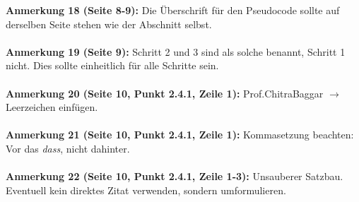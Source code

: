 \documentclass[a4paper,12pt]{book}
\begin{document}
\noindent
\textbf{Anmerkung 18 (Seite 8-9):}
Die Überschrift für den Pseudocode sollte auf derselben Seite stehen wie der Abschnitt selbst. \\
\\

\noindent
\textbf{Anmerkung 19 (Seite 9):}
Schritt 2 und 3 sind als solche benannt, Schritt 1 nicht. Dies sollte einheitlich für alle Schritte sein. \\
\\

\noindent
\textbf{Anmerkung 20 (Seite 10, Punkt 2.4.1, Zeile 1):}
Prof.ChitraBaggar $\rightarrow$ Leerzeichen einfügen. \\
\\

\noindent
\textbf{Anmerkung 21 (Seite 10, Punkt 2.4.1, Zeile 1):}
Kommasetzung beachten: Vor das \emph{dass}, nicht dahinter. \\
\\

\noindent
\textbf{Anmerkung 22 (Seite 10, Punkt 2.4.1, Zeile 1-3):}
Unsauberer Satzbau. Eventuell kein direktes Zitat verwenden, sondern umformulieren. \\
\\
\end{document}
